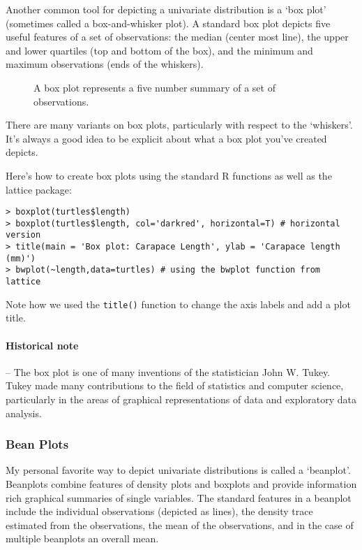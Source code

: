 Another common tool for depicting a univariate distribution is a `box
plot' (sometimes called a box-and-whisker plot). A standard box plot
depicts five useful features of a set of observations: the median
(center most line), the upper and lower quartiles (top and bottom of the
box), and the minimum and maximum observations (ends of the whiskers).

\begin{figure}[htbp]
\centering
\caption{A box plot represents a five number summary of a set of
observations.}
\end{figure}

There are many variants on box plots, particularly with respect to the
`whiskers'. It's always a good idea to be explicit about what a box plot
you've created depicts.

Here's how to create box plots using the standard R functions as well as
the lattice package:

\begin{lstlisting}
> boxplot(turtles$length)
> boxplot(turtles$length, col='darkred', horizontal=T) # horizontal version 
> title(main = 'Box plot: Carapace Length', ylab = 'Carapace length (mm)')
> bwplot(~length,data=turtles) # using the bwplot function from lattice
\end{lstlisting}
Note how we used the \lstinline!title()! function to change the axis
labels and add a plot title.

\paragraph{Historical note}

-- The box plot is one of many inventions of the statistician John W.
Tukey. Tukey made many contributions to the field of statistics and
computer science, particularly in the areas of graphical representations
of data and exploratory data analysis.

\subsubsection{Bean Plots}

My personal favorite way to depict univariate distributions is called a
`beanplot'. Beanplots combine features of density plots and boxplots and
provide information rich graphical summaries of single variables. The
standard features in a beanplot include the individual observations
(depicted as lines), the density trace estimated from the observations,
the mean of the observations, and in the case of multiple beanplots an
overall mean.

